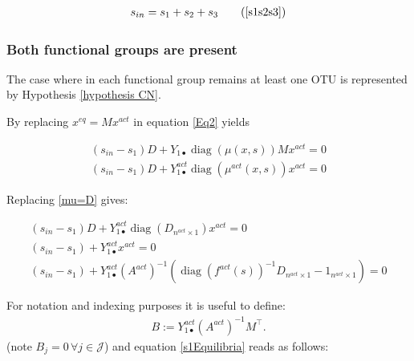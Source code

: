 \documentclass[3p,times]{article}
\DeclareMathOperator{\diag}{diag}
\begin{document}
\begin{align}
s_{in} = s_1+s_2+s_3 \tag{\ref{s1s2s3}}
\end{align}

\subsubsection{Both functional groups are present}

The case where in each functional group remains at least one OTU is represented by Hypothesis \ref{hypothesis CN}.

By replacing $x^{eq} = Mx^{act}$ in equation \eqref{Eq2} yields


\begin{align}
(s_{in}-s_1)D + Y_{1\bullet} \diag(\mu(x,s))Mx^{act}  = 0 \\
(s_{in}-s_1)D + Y^{act}_{1\bullet} \diag(\mu^{act}(x,s))x^{act}  = 0 
\end{align}

Replacing \eqref{mu=D} gives: 

\begin{align} 
(s_{in}-s_1)D + Y^{act}_{1\bullet} \diag(D_{n^{act}\times 1})x^{act}  = 0  \\
(s_{in}-s_1) + Y^{act}_{1\bullet} x^{act}  = 0  \\
\label{s1Equilibria} (s_{in}-s_1) + Y^{act}_{1\bullet}(A^{act})^{-1}(\diag(f^{act}(s))^{-1}D_{n^{act}\times 1} - 1_{n^{act}\times 1}) = 0
\end{align} 

For notation and indexing purposes it is useful to define: 
\begin{align}
B := Y^{act}_{1\bullet} (A^{act})^{-1}M^\top.
\end{align}
(note $B_j = 0 \, \forall j \in \mathcal{J}$) and equation \eqref{s1Equilibria} reads as follows:
\end{document}
